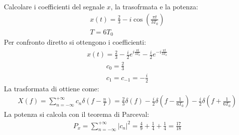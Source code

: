 \documentclass{article}
\begin{document}
Calcolare i coefficienti del segnale $x$, la trasofrmata e la potenza:
\begin{gather*}
    x(t)=\displaystyle\frac{2}{3}-i\cos\left(\frac{\pi t}{3T_0}\right)\\
    T=6T_0
\end{gather*}
Per confronto diretto si ottengono i coefficienti:
\begin{gather*}
    x(t)=\displaystyle\frac{2}{3}-\frac{i}{2}e^{i\frac{\pi t}{3T_0}}-\frac{i}{2}e^{-i\frac{\pi t}{3T_0}}
\end{gather*}
\begin{gather}
    c_0=\displaystyle\frac{2}{3}\\
    c_{1}=c_{-1}=\displaystyle-\frac{i}{2}
\end{gather}
La trasformata di ottiene come:
\begin{gather}
    X(f)=\displaystyle\sum_{n=-\infty}^{+\infty}c_n\delta\left(f-\frac{n}{T}\right)=\frac{2}{3}\delta(f)-\frac{i}{2}\delta\left(f-\frac{1}{6T_0}\right)-\frac{i}{2}\delta\left(f+\frac{1}{6T_0}\right)
\end{gather}
La potenza si calcola con il teorema di Parceval:
\begin{gather}
    P_x=\displaystyle\sum_{n=-\infty}^{+\infty}|c_n|^2=\frac{4}{9}+\frac{1}{4}+\frac{1}{4}=\frac{17}{18}
\end{gather}
\end{document}
